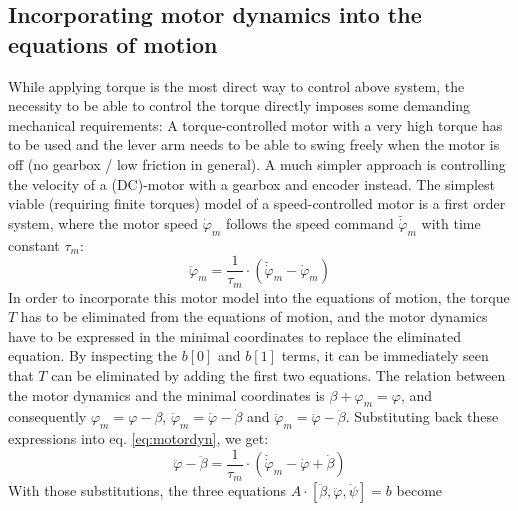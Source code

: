 \documentclass{article}
\begin{document}
\subsection{Incorporating motor dynamics into the equations of motion}
\label{ss:EoM}
While applying torque is the most direct way to control above system, the necessity to be able to control the torque directly imposes some demanding mechanical requirements:
A torque-controlled motor with a very high torque has to be used and the lever arm needs to be able to swing freely when the motor is off (no gearbox / low friction in general).
A much simpler approach is controlling the velocity of a (DC)-motor with a gearbox and encoder instead. The simplest viable (requiring finite torques) model of a speed-controlled motor is a first order system, where the motor speed $\dot{\varphi}_m$ follows the speed command $\breve{\dot{\varphi}}_m$ with time constant $\tau_m$:
\begin{equation}
\ddot{\varphi}_m = \frac{1}{\tau_m} \cdot \left(\breve{\dot{\varphi}}_m - \dot{\varphi}_m \right)
\label{eq:motordyn}
\end{equation}
In order to incorporate this motor model into the equations of motion, the torque $T$ has to be eliminated from the equations of motion, and the motor dynamics have to be expressed in the minimal coordinates to replace the eliminated equation.
By inspecting the $b[0]$ and $b[1]$ terms, it can be immediately seen that $T$ can be eliminated by adding the first two equations.
The relation between the motor dynamics and the minimal coordinates is $\beta + \varphi_m = \varphi$, and consequently $\varphi_m = \varphi - \beta$, $\dot{\varphi}_m = \dot{\varphi} - \dot{\beta}$ and $\ddot{\varphi}_m = \ddot{\varphi} - \ddot{\beta}$.
Substituting back these expressions into eq. \ref{eq:motordyn}, we get:
\begin{equation}
\ddot{\varphi} - \ddot{\beta} = \frac{1}{\tau_m} \cdot \left(\breve{\dot{\varphi}}_m - \dot{\varphi} + \dot{\beta} \right)
\end{equation}
With those substitutions, the three equations $A \cdot [\ddot{\beta}, \ddot{\varphi}, \ddot{\psi}] = b$ become
\end{document}
